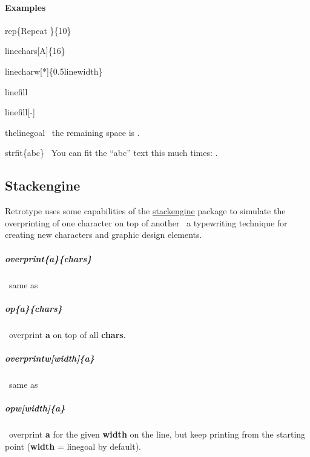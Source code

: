\documentclass[english,12pt,openany,letterpaper]{book}
\begin{document}
\paragraph{Examples}

\bs rep\{Repeat \}\{10\}


\skipline

\bs linechars[A]\{16\}


\skipline

\bs linecharw[*]\{0.5\bs linewidth\}


\skipline

\bs linefill

\linefill

\skipline

\bs linefill[-]

\linefill[-]

\skipline

\bs the\bs linegoal \dash\ the remaining space is \the\linegoal.

\skipline

\bs strfit\{abc\} \dash\ You can fit the ``abc'' text this much times: .


\break


\subsection{Stackengine}

Retrotype uses some capabilities of the \href{https://www.ctan.org/pkg/stackengine}{stackengine} package to simulate the overprinting of one character on top of another \dash\ a typewriting technique for creating new characters and graphic design elements.

\skipline

\subparagraph{\bs overprint\{a\}\{chars\}} \dash\ same as

\subparagraph{\tabspace\bs op\{a\}\{chars\}} \dash\ overprint \textbf{a} on top of all \textbf{chars}.

\subparagraph{\bs overprintw[width]\{a\}} \dash\ same as

\subparagraph{\tabspace\bs opw[width]\{a\}} \dash\ overprint \textbf{a} for the given \textbf{width} on the line, but keep printing from the starting point (\textbf{width} = \bs linegoal by default).

\skipline
\end{document}
